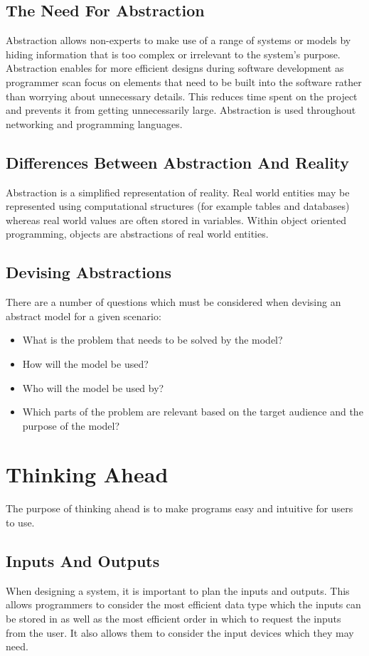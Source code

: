 \documentclass[a4paper,11pt, twocolumn]{article}
\begin{document}
\subsection{The Need For Abstraction}
Abstraction allows non-experts to make use of a range of systems or models by hiding information that is too complex or irrelevant to the system's purpose. Abstraction enables for more efficient designs during software development as programmer scan focus on elements that need to be built into the software rather than worrying about unnecessary details. This reduces time spent on the project and prevents it from getting unnecessarily large. Abstraction is used throughout networking and programming languages.
\subsection{Differences Between Abstraction And Reality}
Abstraction is a simplified representation of reality. Real world entities may be represented using computational structures (for example tables and databases) whereas real world values are often stored in variables. Within object oriented programming, objects are abstractions of real world entities. 
\subsection{Devising Abstractions}
There are a number of questions which must be considered when devising an abstract model for a given scenario:
\begin{itemize}
    \item What is the problem that needs to be solved by the model?
    \item How will the model be used?
    \item Who will the model be used by?
    \item Which parts of the problem are relevant based on the target audience and the purpose of the model?
\end{itemize}

\section{Thinking Ahead}
The purpose of thinking ahead is to make programs easy and intuitive for users to use.
\subsection{Inputs And Outputs}
When designing a system, it is important to plan the inputs and outputs. This allows programmers to consider the most efficient data type which the inputs can be stored in as well as the most efficient order in which to request the inputs from the user. It also allows them to consider the input devices which they may need. 
\end{document}
